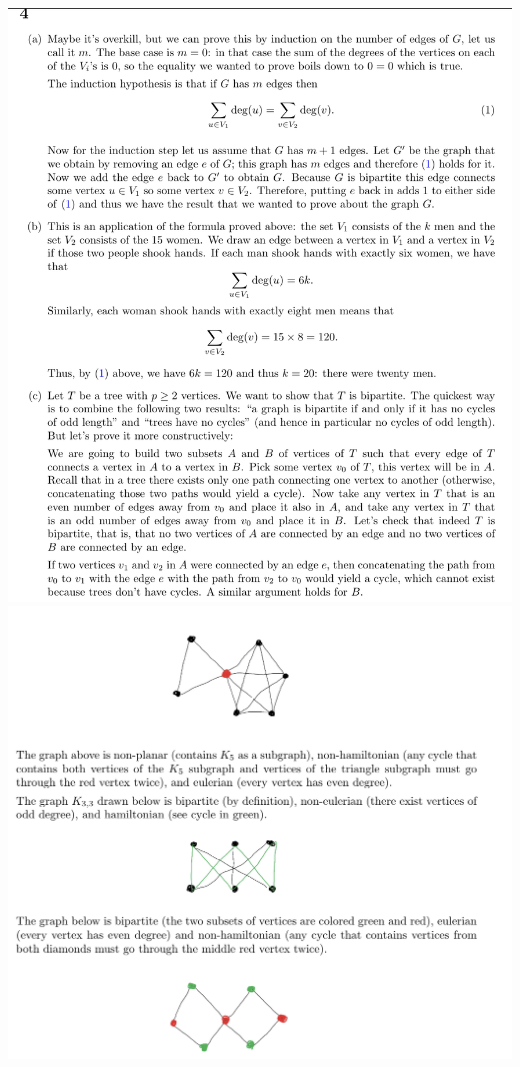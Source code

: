 \documentclass[10pt,landscape]{article}
\begin{document}
\begin{multicols}{2}
\includegraphics[width = 10 cm]{MockA4p1.png}
\includegraphics[width = 10 cm]{MockA4p2.png}


\end{multicols}
\end{document}
